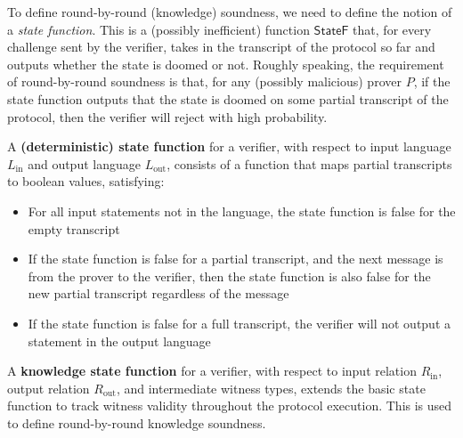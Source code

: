 To define round-by-round (knowledge) soundness, we need to define the notion of a \emph{state function}. This is a (possibly inefficient) function $\mathsf{StateF}$ that, for every challenge sent by the verifier, takes in the transcript of the protocol so far and outputs whether the state is doomed or not. Roughly speaking, the requirement of round-by-round soundness is that, for any (possibly malicious) prover $P$, if the state function outputs that the state is doomed on some partial transcript of the protocol, then the verifier will reject with high probability.

\begin{definition}
    \label{def:state_function}
    A \textbf{(deterministic) state function} for a verifier, with respect to input language $L_{\text{in}}$ and
    output language $L_{\text{out}}$, consists of a function that maps partial transcripts to boolean values, satisfying:
    \begin{itemize}
        \item For all input statements not in the language, the state function is false for the empty transcript
        \item If the state function is false for a partial transcript, and the next message is from the
        prover to the verifier, then the state function is also false for the new partial transcript
        regardless of the message
        \item If the state function is false for a full transcript, the verifier will not output a statement
        in the output language
    \end{itemize}
\end{definition}

\begin{definition}
    \label{def:knowledge_state_function}
    A \textbf{knowledge state function} for a verifier, with respect to input relation $R_{\text{in}}$, output
    relation $R_{\text{out}}$, and intermediate witness types, extends the basic state function to track
    witness validity throughout the protocol execution. This is used to define round-by-round knowledge soundness.
\end{definition}

